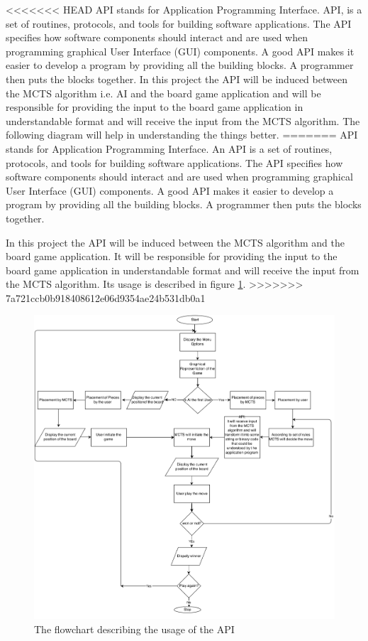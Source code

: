 <<<<<<< HEAD
API stands for Application Programming Interface. API, is a set of routines, protocols, and tools for building software applications. The API specifies how software components should interact and are used when programming graphical User Interface (GUI) components. A good API makes it easier to develop a program by providing all the building blocks. A programmer then puts the blocks together.\bigbreak
 In this project the API will be induced between the MCTS algorithm i.e. AI and the board game application and will be responsible for providing the input to the board game application in understandable format and will receive the input from the MCTS algorithm. The following diagram will help in understanding the things better.
=======
API stands for Application Programming Interface. An API is a set of routines, protocols, and tools for building software applications. The API specifies how software components should interact and are used when programming graphical User Interface (GUI) components. A good API makes it easier to develop a program by providing all the building blocks. A programmer then puts the blocks together.

 In this project the API will be induced between the MCTS algorithm and the board game application. It will be responsible for providing the input to the board game application in understandable format and will receive the input from the MCTS algorithm. Its usage is described in figure \ref{fig:flowchart}.
>>>>>>> 7a721ccb0b918408612e06d9354ae24b531db0a1

\bigbreak

\begin{figure}[H]
	\centering
	\includegraphics[width=\textwidth]{2General_Architecture/2.2API/img/DiagramAPI.png}
	\caption{The flowchart describing the usage of the API}
	\label{fig:flowchart}
\end{figure}


